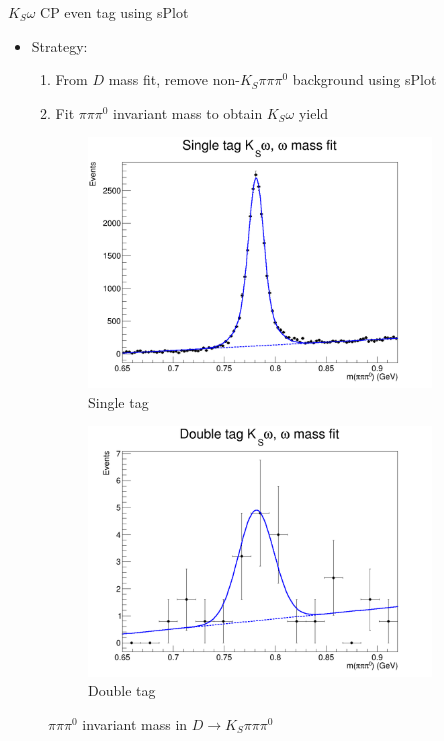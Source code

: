 \documentclass{beamer}
\begin{document}
\begin{frame}{$K_S\omega$ CP even tag using sPlot}
  \begin{itemize}
    \item{Strategy:}
    \begin{enumerate}
      \item{From $D$ mass fit, remove non-$K_S\pi\pi\pi^0$ background using sPlot}
      \item{Fit $\pi\pi\pi^0$ invariant mass to obtain $K_S\omega$ yield}
    \end{enumerate}
  \end{itemize}
  \begin{figure}
    \centering
    \vspace{-0.2cm}
    \begin{subfigure}{0.40\textwidth}
      \includegraphics[width = 1.0\textwidth]{Plots/KSomega_ST_Mpipipi0.png}
      \caption{Single tag}
    \end{subfigure}%
    \begin{subfigure}{0.40\textwidth}
      \includegraphics[width = 1.0\textwidth]{Plots/KSomega_DT_Mpipipi0.png}
      \caption{Double tag}
    \end{subfigure}
    \caption{$\pi\pi\pi^0$ invariant mass in $D\to K_S\pi\pi\pi^0$}
  \end{figure}
\end{frame}
\end{document}
